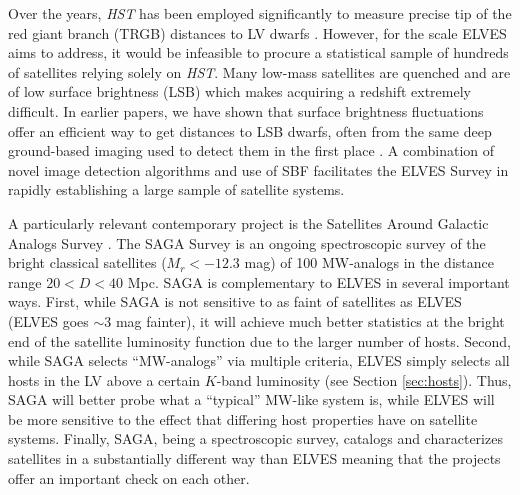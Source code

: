 \documentclass[twocolumn]{aastex62}
\begin{document}
Over the years, \emph{HST} has been employed significantly to measure precise tip of the red giant branch (TRGB) distances to LV dwarfs \citep[e.g.][]{karachentsev2006, karachentsev2007, karachentsev2013, karachentsev2020, jacobs2009, anand2021}. However, for the scale ELVES aims to address, it would be infeasible to procure a statistical sample of hundreds of satellites relying solely on \emph{HST}. Many low-mass satellites are quenched \citep[i.e., without nebular emission lines or HI reservoirs;][]{karunakaran2020, putman2021} and are of low surface brightness (LSB) which makes acquiring a redshift extremely difficult. In earlier papers, we have shown that surface brightness fluctuations \citep[SBF;][]{tonry1988, jerjen_field, jerjen_field2, cantiello2018} offer an efficient way to get distances to LSB dwarfs, often from the same deep ground-based imaging used to detect them in the first place \citep{sbf_calib, sbf_m101, greco2020}. A combination of novel image detection algorithms and use of SBF facilitates the ELVES Survey in rapidly establishing a large sample of satellite systems.


A particularly relevant contemporary project is the Satellites Around Galactic Analogs Survey \citep[SAGA,][]{geha2017, mao2020}. The SAGA Survey is an ongoing spectroscopic survey of the bright classical satellites ($M_r<-12.3$ mag) of 100 MW-analogs in the distance range $20 < D < 40$ Mpc. SAGA is complementary to ELVES in several important ways. First, while SAGA is not sensitive to as faint of satellites as ELVES (ELVES goes $\sim3$ mag fainter), it will achieve much better statistics at the bright end of the satellite luminosity function due to the larger number of hosts. Second, while SAGA selects ``MW-analogs'' via multiple criteria, ELVES simply selects all hosts in the LV above a certain $K$-band luminosity (see Section \ref{sec:hosts}). Thus, SAGA will better probe what a ``typical'' MW-like system is, while ELVES will be more sensitive to the effect that differing host properties have on satellite systems. Finally, SAGA, being a spectroscopic survey, catalogs and characterizes satellites in a substantially different way than ELVES meaning that the projects offer an important check on each other.
\end{document}
